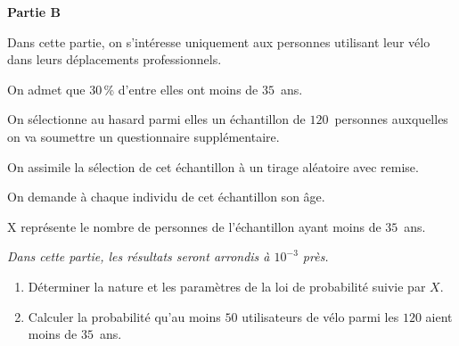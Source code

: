 \documentclass[10pt]{article}
\begin{document}
\bigskip

\textbf{Partie B}

\medskip

Dans cette partie, on s'intéresse uniquement aux personnes utilisant leur vélo dans leurs déplacements professionnels.

\medskip

On admet que 30\,\% d'entre elles ont moins de $35$~ans.

On sélectionne au hasard parmi elles un échantillon de $120$~personnes auxquelles on va soumettre un questionnaire supplémentaire. 

On assimile la sélection de cet échantillon à un tirage aléatoire avec remise.

\medskip

On demande à chaque individu de cet échantillon son âge.

\medskip

X représente le nombre de personnes de l'échantillon ayant moins de $35$~ans.

\medskip

\emph{Dans cette partie, les résultats seront arrondis à $10^{-3}$ près.}

\medskip

\begin{enumerate}
\item Déterminer la nature et les paramètres de la loi de probabilité suivie par $X$.
\item Calculer la probabilité qu'au moins $50$ utilisateurs de vélo parmi les $120$ aient moins de $35$~ans.
\end{enumerate}

\bigskip
\end{document}
